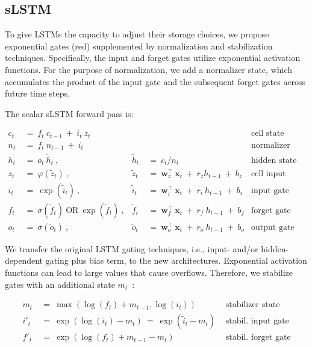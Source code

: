 \subsection{sLSTM}
\label{sec:sLSTM}

To give LSTMs the capacity to adjust their storage choices, we propose exponential gates (red) supplemented by normalization and stabilization techniques. Specifically, the input and forget gates utilize exponential activation functions. For the purpose of normalization, we add a normalizer state, which accumulates the product of the input gate and the subsequent forget gates across future time steps.

The scalar sLSTM forward pass is:

\begin{align}
\label{eq:slstmforward}
c_t \ &= \  f_t \ c_{t-1} \ + \ i_t \ z_t & & 
 &\text{cell state} \\
n_t \ &= \  f_t \ n_{t-1} \ + \ i_t  & & 
 &\text{normalizer state} \\
h_t \ &= \ o_t \ \tilde{h}_t \ ,
  &\tilde{h}_t \ &= \ c_t / n_t
&\text{hidden state} \\
z_t \ &= \ \varphi \left( \tilde{z}_t \right) \ , 
  &\tilde{z}_t \ &=  \ \mathbf{w}^\top_{z} \ \mathbf{x}_t \ + \
  r_{z}  h_{t-1} \ + \  b_{z}
  &\text{cell input} \\
i_t \ &= \ \!\exp \left( \tilde{i}_t  \right) \ , 
  &\tilde{i}_t \ &= \ \mathbf{w}^\top_{i} \ \mathbf{x}_t \ + \
  r_{i}  \ h_{t-1} \ + \  b_{i}
  &\text{input gate} \\
f_t \ &= \ \sigma \left(  \tilde{f}_t \right) \ \text{OR} \
\!\exp \left(  \tilde{f}_t \right) \ ,
  &\tilde{f}_t \ &= \ \mathbf{w}^\top_{f} \ \mathbf{x}_t  \ + \
  r_{f}  \ h_{t-1} \ + \  b_{f}
  &\text{forget gate} \\
o_t \ &= \ \sigma \left( \tilde{o}_t \right) \ , 
  &\tilde{o}_t  \ &= \ \mathbf{w}^\top_{o} \ \mathbf{x}_t \ + \
  r_{o}  \ h_{t-1} \ + \  b_{o}
  &\text{output gate} 
\end{align}

We transfer the original LSTM gating techniques, i.e., input- and/or hidden-dependent gating plus bias term, to the new architectures. Exponential activation functions can lead to large values that cause overflows. Therefore, we stabilize gates with an additional state \mbox{$m_t$~\citep{Milakov:18arxiv}}:

\begin{align}
\label{eq:slstmstabil}
m_t \ &= \ \max \left( \log ( f_t ) + m_{t-1} , \log ( i_t ) \right) &\text{stabilizer state} \\
i'_t \ &= \ \!\exp \left( \log \left ( i_t \right) - m_t \right) \ = \ \!\exp \left( \tilde{i}_t - m_t \right) \ \, 
  &\text{stabil. input gate} \\
f'_t \ &= \ \!\exp \left( \log \left( f_t \right) + m_{t-1} - m_t \right) \ \, 
  &\text{stabil. forget gate}
\end{align}

